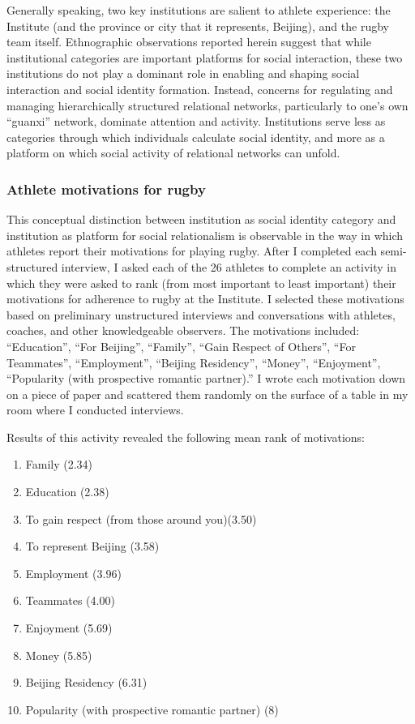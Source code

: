 \begin{CJK}{UTF8}{gbsn}
Generally speaking, two key institutions are salient to athlete experience: the Institute (and the province or city that it represents, Beijing), and the rugby team itself.  Ethnographic observations reported herein suggest that while institutional categories are important platforms for social interaction, these two institutions do not play a dominant role in enabling and shaping social interaction and social identity formation.  Instead, concerns for regulating and managing hierarchically structured relational networks, particularly to one's own ``guanxi'' network, dominate attention and activity.  Institutions serve less as categories through which individuals calculate social identity, and more as a platform on which social activity of relational networks can unfold.

\subsubsection{Athlete motivations for rugby}
This conceptual distinction between institution as social identity category and institution as platform for social relationalism is observable in the way in which athletes report their motivations for playing rugby.  After I completed each semi-structured interview, I asked each of the 26 athletes to complete an activity in which they were asked to rank (from most important to least important) their motivations for adherence to rugby at the Institute.  I selected these motivations based on preliminary unstructured interviews and conversations with athletes, coaches, and other knowledgeable observers.  The motivations included: ``Education'', ``For Beijing'', ``Family'', ``Gain Respect of Others'', ``For Teammates'', ``Employment'', ``Beijing Residency'', ``Money'', ``Enjoyment'', ``Popularity (with prospective romantic partner).'' I wrote each motivation down on a piece of paper and scattered them randomly on the surface of a table in my room where I conducted interviews.

Results of this activity revealed the following mean rank of motivations:

  \begin{enumerate}
    \item Family (2.34)
    \item Education (2.38)
    \item To gain respect (from those around you)(3.50)
    \item To represent Beijing (3.58)
    \item Employment (3.96)
    \item Teammates (4.00)
    \item Enjoyment (5.69)
    \item Money (5.85)
    \item Beijing Residency (6.31)
    \item Popularity (with prospective romantic partner) (8)
  \end{enumerate}


\end{CJK}
